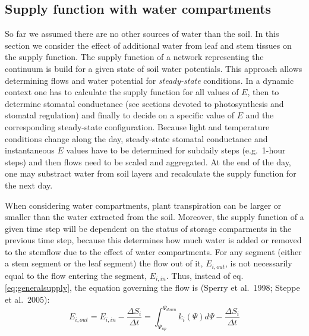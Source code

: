 \documentclass[]{book}
\begin{document}
\hypertarget{supply-function-with-water-compartments}{%
\subsection{Supply function with water compartments}\label{supply-function-with-water-compartments}}

So far we assumed there are no other sources of water than the soil. In this section we consider the effect of additional water from leaf and stem tissues on the supply function. The supply function of a network representing the continuum is build for a given state of soil water potentials. This approach allows determining flows and water potential for \emph{steady-state} conditions. In a dynamic context one has to calculate the supply function for all values of \(E\), then to determine stomatal conductance (see sections devoted to photosynthesis and stomatal regulation) and finally to decide on a specific value of \(E\) and the corresponding steady-state configuration. Because light and temperature conditions change along the day, steady-state stomatal conductance and instantaneous \(E\) values have to be determined for subdaily steps (e.g.~1-hour steps) and then flows need to be scaled and aggregated. At the end of the day, one may substract water from soil layers and recalculate the supply function for the next day.

When considering water compartments, plant transpiration can be larger or smaller than the water extracted from the soil. Moreover, the supply function of a given time step will be dependent on the status of storage comparments in the previous time step, because this determines how much water is added or removed to the stemflow due to the effect of water compartments. For any segment (either a stem segment or the leaf segment) the flow out of it, \(E_{i,out}\), is not necessarily equal to the flow entering the segment, \(E_{i, in}\). Thus, instead of eq. \ref{eq:generalsupply}, the equation governing the flow is (Sperry et al.~1998; Steppe et al.~2005):
\begin{equation}
E_{i,out} = E_{i, in} - \frac{\Delta S_{i}}{\Delta t} = \int_{\Psi_{up}}^{\Psi_{down}}{k_i(\Psi) d\Psi} - \frac{\Delta S_{i}}{\Delta t}
\end{equation}
\end{document}
